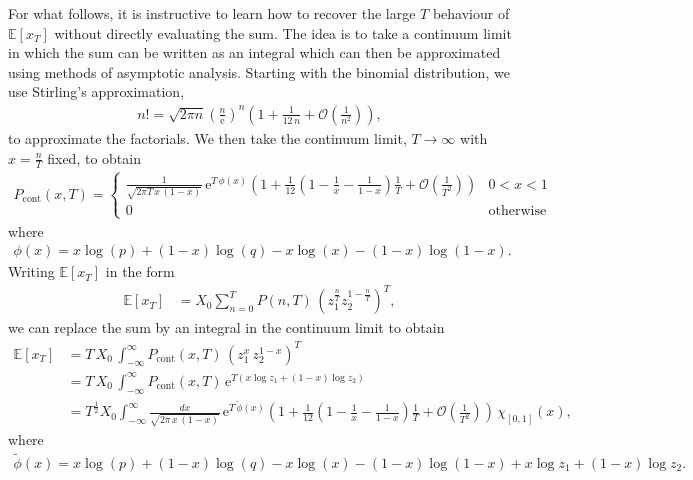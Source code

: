 \documentclass[11pt]{article}
\begin{document}
For what follows, it is instructive to learn how to recover the large $T$ behaviour of $\mathbb{E}\left[x_T \right]$ without directly evaluating the sum.
The idea is to take a continuum limit in which the sum can be written as an integral which can then be approximated using methods of asymptotic analysis.
Starting with the binomial distribution, we use Stirling's approximation,
\begin{align}
n! = \sqrt{2 \pi n} \left( \frac{n}{\mathrm{e}}\right)^n\left(1 + \frac{1}{12\,n} + \mathcal{O}\left(\frac{1}{n^2}\right)\right),
\end{align}
to approximate the factorials. We then take the continuum limit, $T\to \infty$ with $x=\frac{n}{T}$ fixed,
 to obtain 
\begin{align}
\label{eq-binomial-distribution-cts-limit}
P_\text{cont}(x, T) = \left\{
\begin{array}{ll}
\frac{1}{\sqrt{2 \pi T \,x\,(1-x)}}\,\mathrm{e}^{T\,\phi(x)}\left(1 + \frac{1}{12}\left( 1-\frac{1}{x} - \frac{1}{1-x}\right) \frac{1}{T}   + \mathcal{O}\left(\frac{1}{T^2}\right)\right) & 0 < x< 1\\
0 & \text{otherwise}
\end{array}
\right.
\end{align}
where
\begin{align}
\label{eq-phi}
\phi(x) =    x \log(p) +  (1 - x) \log (q)  - x \log(x) -  (1 - x) \log(1 - x).
\end{align}
Writing $\mathbb{E}\left[x_T \right]$ in the form
\begin{align*}
\mathbb{E}\left[x_T \right] &=   X_0 \sum_{n=0}^T  P(n,T) \, \left(z_1^\frac{n}{T} z_2^{1-\frac{n}{T}}\right)^T,
\end{align*}
we can replace the sum by an integral in the continuum limit to obtain
\begin{align}
\nonumber \mathbb{E}\left[x_T \right] &=   T\,X_0\, \int_{-\infty}^\infty P_\text{cont}(x, T)\,\left( z_1^x\,z_2^{1-x}\right)^T\\ 
\nonumber & = T\,X_0\, \int_{-\infty}^\infty P_\text{cont}(x, T)\,\mathrm{e}^{T\left(x\log z_1 + (1-x)\log z_2 \right)}\\
\label{eq-Ex-mult1} & = T^\frac{1}{2} X_0  \int_{-\infty}^\infty  \frac{d x}{\sqrt{2 \pi \,x\,(1-x)}}\,\mathrm{e}^{T\,\widetilde{\phi}(x)}\left(1 + \frac{1}{12}\left( 1-\frac{1}{x} - \frac{1}{1-x}\right) \frac{1}{T}   + \mathcal{O}\left(\frac{1}{T^2}\right)\right) \, \chi_{\left[0, 1\right]}(x),
\end{align}
where 
\begin{align}
\widetilde{\phi}(x) =  x \log(p) +  (1 - x) \log (q)  - x \log(x) -  (1 - x) \log(1 - x) + x \log z_1 +  (1-x)\log z_2.
\end{align}
\end{document}
